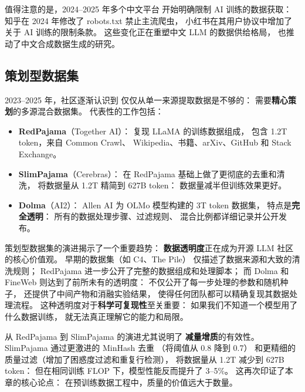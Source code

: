 值得注意的是，2024--2025 年多个中文平台
开始明确限制 AI 训练的数据获取：
知乎在 2024 年修改了 robots.txt 禁止主流爬虫，
小红书在其用户协议中增加了关于 AI 训练的限制条款。
这些变化正在重塑中文 LLM 的数据供给格局，
也推动了中文合成数据生成的研究。

\subsection{策划型数据集}

2023--2025 年，社区逐渐认识到
仅仅从单一来源提取数据是不够的：
需要\textbf{精心策划}的多源混合数据集。
代表性的工作包括：

\begin{itemize}[noitemsep]
  \item \textbf{RedPajama}（Together AI）：
        复现 LLaMA 的训练数据组成，
        包含 1.2T token，来自 Common Crawl、
        Wikipedia、书籍、arXiv、GitHub 和
        Stack Exchange。
  \item \textbf{SlimPajama}（Cerebras）：
        在 RedPajama 基础上做了更彻底的去重和清洗，
        将数据量从 1.2T 精简到 627B token：
        数据量减半但训练效果更好。
  \item \textbf{Dolma}（AI2）：
        Allen AI 为 OLMo 模型构建的 3T token 数据集，
        特点是\textbf{完全透明}：
        所有的数据处理步骤、过滤规则、
        混合比例都详细记录并公开发布。
\end{itemize}

策划型数据集的演进揭示了一个重要趋势：
\textbf{数据透明度}正在成为开源 LLM 社区的核心价值观。
早期的数据集（如 C4、The Pile）
仅描述了数据来源和大致的清洗规则；
RedPajama 进一步公开了完整的数据组成和处理脚本；
而 Dolma 和 FineWeb 则达到了前所未有的透明度：
不仅公开了每一步处理的参数和随机种子，
还提供了中间产物和消融实验结果，
使得任何团队都可以精确复现其数据处理流程。
这种透明度对于\textbf{科学可复现性}至关重要：
如果我们不知道一个模型用了什么数据训练，
就无法真正理解它的能力和局限。

从 RedPajama 到 SlimPajama 的演进尤其说明了
\textbf{减量增质}的有效性。
SlimPajama 通过更激进的 MinHash 去重
（将阈值从 0.8 降到 0.7）
和更精细的质量过滤（增加了困惑度过滤和重复行检测），
将数据量从 1.2T 减少到 627B token：
但在相同训练 FLOP 下，模型性能反而提升了 3--5\%。
这再次印证了本章的核心论点：
在预训练数据工程中，质量的价值远大于数量。

